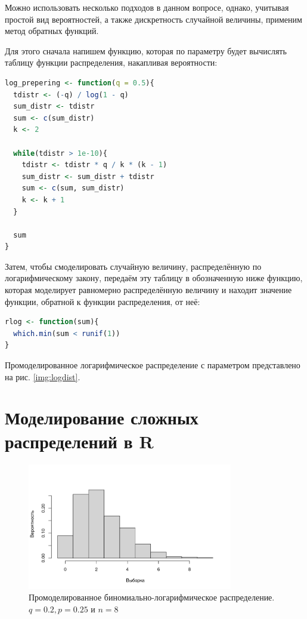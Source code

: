 \documentclass[12pt, specialist, subf, substylefile = spbu.rtx]{disser}
\begin{document}
	Можно использовать несколько подходов в данном вопросе, однако, учитывая простой вид вероятностей, а также дискретность случайной величины, применим метод обратных функций.
	
	Для этого сначала напишем функцию, которая по параметру будет вычислять таблицу функции распределения, накапливая вероятности:  
	
	\begin{lstlisting}[language=R]
log_prepering <- function(q = 0.5){
  tdistr <- (-q) / log(1 - q)
  sum_distr <- tdistr
  sum <- c(sum_distr)
  k <- 2
	
  while(tdistr > 1e-10){
    tdistr <- tdistr * q / k * (k - 1)
    sum_distr <- sum_distr + tdistr
    sum <- c(sum, sum_distr)
    k <- k + 1
  }
	
  sum
}
	\end{lstlisting}
	
	Затем, чтобы смоделировать случайную величину, распределённую по логарифмическому закону, передаём эту таблицу в обозначенную ниже функцию, которая моделирует равномерно распределённую величину и находит значение функции, обратной к функции распределения, от неё:
	
	\begin{lstlisting}[language=R]
rlog <- function(sum){
  which.min(sum < runif(1))
}
	\end{lstlisting}	
	
	Промоделированное логарифмическое распределение с параметром представлено на рис. \ref{img:logdist}.
	
	\section{Моделирование сложных распределений в R}
	
	\begin{figure}[ht]
		\centering
		\includegraphics[width = 0.8\textwidth]{binlogsample}
		\caption{Промоделированное биномиально-логарифмическое распределение. $ q = 0.2, p = 0.25 $ и $ n = 8 $}
		\label{img:binlogsample}
	\end{figure}
	
\end{document}
